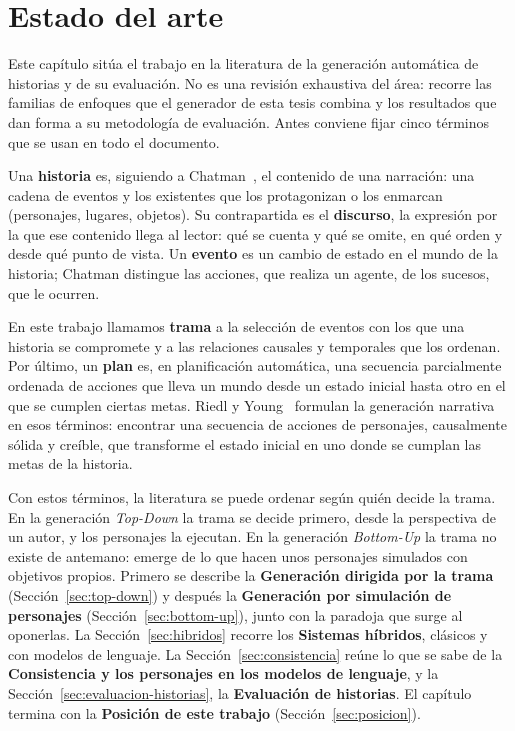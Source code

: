 \chapter{Estado del arte}\label{chapter:state-of-the-art}

Este capítulo sitúa el trabajo en la literatura de la generación automática de historias y de su
evaluación. No es una revisión exhaustiva del área: recorre las familias de enfoques que el
generador de esta tesis combina y los resultados que dan forma a su metodología de evaluación.
Antes conviene fijar cinco términos que se usan en todo el documento.

Una \textbf{historia} es, siguiendo a Chatman~\cite{chatman1978}, el contenido de una narración:
una cadena de eventos y los existentes que los protagonizan o los enmarcan (personajes, lugares,
objetos). Su contrapartida es el \textbf{discurso}, la expresión por la que ese contenido llega al
lector: qué se cuenta y qué se omite, en qué orden y desde qué punto de vista. Un
\textbf{evento} es un cambio de estado en el mundo de la historia; Chatman distingue las acciones,
que realiza un agente, de los sucesos, que le ocurren.

En este trabajo llamamos \textbf{trama} a la
selección de eventos con los que una historia se compromete y a las relaciones causales y
temporales que los ordenan. Por último, un \textbf{plan} es, en planificación automática, una
secuencia parcialmente ordenada de acciones que lleva un mundo desde un estado inicial hasta otro
en el que se cumplen ciertas metas. Riedl y Young~\cite{riedl2010} formulan la generación narrativa
en esos términos: encontrar una secuencia de acciones de personajes, causalmente sólida y creíble,
que transforme el estado inicial en uno donde se cumplan las metas de la historia.

Con estos términos, la literatura se puede ordenar según quién decide la trama. En la generación
\textit{Top-Down} la trama se decide primero, desde la perspectiva de un autor, y los personajes la
ejecutan. En la generación \textit{Bottom-Up} la trama no existe de antemano: emerge de lo que hacen
unos personajes simulados con objetivos propios. Primero se describe la \textbf{Generación dirigida
por la trama} (Sección~\ref{sec:top-down}) y después la \textbf{Generación por simulación de
personajes} (Sección~\ref{sec:bottom-up}), junto con la paradoja que surge al oponerlas. La
Sección~\ref{sec:hibridos} recorre los \textbf{Sistemas híbridos}, clásicos y con modelos de
lenguaje. La Sección~\ref{sec:consistencia} reúne lo que se sabe de la \textbf{Consistencia y los
personajes en los modelos de lenguaje}, y la Sección~\ref{sec:evaluacion-historias}, la
\textbf{Evaluación de historias}. El capítulo termina con la \textbf{Posición de este trabajo}
(Sección~\ref{sec:posicion}).

